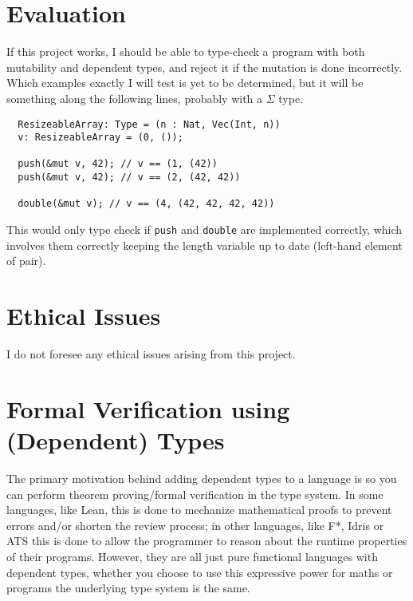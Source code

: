 \documentclass[12pt,twoside]{report}
\begin{document}
\chapter{Evaluation}
If this project works, I should be able to type-check a program with both mutability and dependent types, and reject it if the mutation is done incorrectly. Which examples exactly I will test is yet to be determined, but it will be something along the following lines, probably with a $\Sigma$ type.

\begin{lstlisting}
  ResizeableArray: Type = (n : Nat, Vec(Int, n))
  v: ResizeableArray = (0, ());

  push(&mut v, 42); // v == (1, (42))
  push(&mut v, 42); // v == (2, (42, 42))

  double(&mut v); // v == (4, (42, 42, 42, 42))
\end{lstlisting}

This would only type check if \verb|push| and \verb|double| are implemented correctly, which involves them correctly keeping the length variable up to date (left-hand element of pair).

\chapter{Ethical Issues}
I do not foresee any ethical issues arising from this project.




\appendix 
{}

\chapter{Formal Verification using (Dependent) Types}
\label{verificationwithtypes}

The primary motivation behind adding dependent types to a language is so you can perform theorem proving/formal verification in the type system. In some languages, like Lean, this is done to mechanize mathematical proofs to prevent errors and/or shorten the review process; in other languages, like F*, Idris or ATS this is done to allow the programmer to reason about the runtime properties of their programs. However, they are all just pure functional languages with dependent types, whether you choose to use this expressive power for maths or programs the underlying type system is the same.
\end{document}
